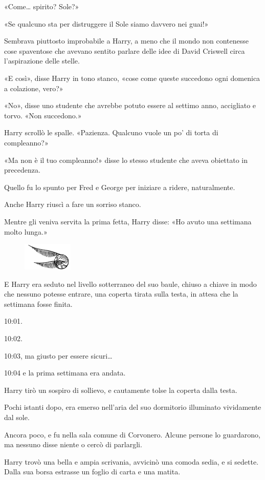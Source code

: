 «Come… spirito? Sole?»

«Se qualcuno sta per distruggere il Sole siamo davvero nei guai!»

Sembrava piuttosto improbabile a Harry, a meno che il mondo non contenesse cose spaventose che avevano sentito parlare delle idee di David Criswell circa l’aspirazione delle stelle.

«E così», disse Harry in tono stanco, «cose come queste succedono ogni domenica a colazione, vero?»

«No», disse uno studente che avrebbe potuto essere al settimo anno, accigliato e torvo. «Non succedono.»

Harry scrollò le spalle. «Pazienza. Qualcuno vuole un po’ di torta di compleanno?»

«Ma non è il tuo compleanno!» disse lo stesso studente che aveva obiettato in precedenza.

Quello fu lo spunto per Fred e George per iniziare a ridere, naturalmente.

Anche Harry riuscì a fare un sorriso stanco.

Mentre gli veniva servita la prima fetta, Harry disse: «Ho avuto una settimana molto lunga.»

\begin{figure}[h!]
        \includegraphics[scale=0.4]{boccino.png}
        \centering
\end{figure}

E Harry era seduto nel livello sotterraneo del suo baule, chiuso a chiave in modo che nessuno potesse entrare, una coperta tirata sulla testa, in attesa che la settimana fosse finita.

10:01.

10:02.

10:03, ma giusto per essere sicuri…

10:04 e la prima settimana era andata.

Harry tirò un sospiro di sollievo, e cautamente tolse la coperta dalla testa.

Pochi istanti dopo, era emerso nell’aria del suo dormitorio illuminato vividamente dal sole.

Ancora poco, e fu nella sala comune di Corvonero. Alcune persone lo guardarono, ma nessuno disse niente o cercò di parlargli.

Harry trovò una bella e ampia scrivania, avvicinò una comoda sedia, e si sedette. Dalla sua borsa estrasse un foglio di carta e una matita.

